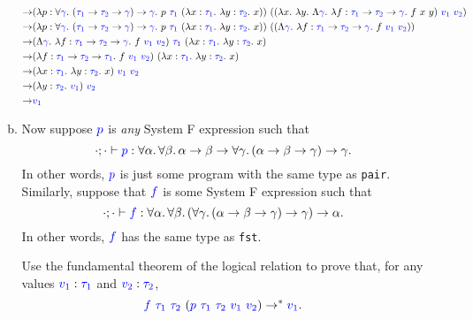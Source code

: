 \documentclass{article}
\theoremstyle{definition}
\newcommand{\meta}[1]{{\color{blue}#1}}
\begin{document}
\begin{enumerate}[start=1,label={{\bf Problem \arabic*}.},ref=\arabic*,left=0pt..0pt,widest*=10,align=left,itemindent=*]
\begin{enumerate}[(a),left=1em]
\begin{align*}
      \to & (\lambda p : \forall \meta{\gamma}.\ (\meta{\tau_1}\to\meta{\tau_2}\to\meta{\gamma}) \to \meta{\gamma}.\ p\ \meta{\tau_1}\ (\lambda x : \meta{\tau_1}.\ \lambda y : \meta{\tau_2}.\ x))\ ((\lambda x.\ \lambda y.\ \Lambda \meta{\gamma}.\ \lambda f : \meta{\tau_1} \to \meta{\tau_2} \to \meta{\gamma}.\ f\ x\ y)\ \meta{v_1}\ \meta{v_2}) \\
      \to & (\lambda p : \forall \meta{\gamma}.\ (\meta{\tau_1}\to\meta{\tau_2}\to\meta{\gamma}) \to \meta{\gamma}.\ p\ \meta{\tau_1}\ (\lambda x : \meta{\tau_1}.\ \lambda y : \meta{\tau_2}.\ x))\ ((\Lambda \meta{\gamma}.\ \lambda f : \meta{\tau_1} \to \meta{\tau_2} \to \meta{\gamma}.\ f\ \meta{v_1}\ \meta{v_2})) \\
      \to & (\Lambda \meta{\gamma}.\ \lambda f : \meta{\tau_1} \to \meta{\tau_2} \to \meta{\gamma}.\ f\ \meta{v_1}\ \meta{v_2})\ \meta{\tau_1}\ (\lambda x : \meta{\tau_1}.\ \lambda y : \meta{\tau_2}.\ x) \\
      \to & (\lambda f : \meta{\tau_1} \to \meta{\tau_2} \to \meta{\tau_1}.\ f\ \meta{v_1}\ \meta{v_2})\ (\lambda x : \meta{\tau_1}.\ \lambda y : \meta{\tau_2}.\ x) \\
      \to & (\lambda x : \meta{\tau_1}.\ \lambda y : \meta{\tau_2}.\ x)\ \meta{v_1}\ \meta{v_2} \\
      \to & (\lambda y : \meta{\tau_2}.\ \meta{v_1})\ \meta{v_2} \\
      \to & \meta{v_1}
    \end{align*}

  \item Now suppose $\meta{p}$ is \emph{any} System F expression such that
    \[
      \cdot;\cdot\vdash \meta{p}:\forall\alpha.\,\forall\beta.\, \alpha\to\beta\to \forall\gamma.\, (\alpha\to\beta\to\gamma)\to\gamma.
    \]
    In other words, $\meta{p}$ is just some program with the same type as
    \texttt{pair}.  Similarly, suppose that $\meta{f}$ is some System F
    expression such that
    \[
      \cdot;\cdot\vdash \meta{f}:\forall\alpha.\,\forall\beta.\, (\forall\gamma.\, (\alpha\to\beta\to\gamma)\to\gamma) \to \alpha.
    \]
    In other words, $\meta{f}$ has the same type as \texttt{fst}.

    Use the fundamental theorem of the logical relation to prove that, for any values
    $\meta{v_1}:\meta{\tau_1}$ and $\meta{v_2}:\meta{\tau_2}$,
    \[
      \meta{f}\ \meta{\tau_1}\ \meta{\tau_2}\ (\meta{p}\ \meta{\tau_1}\ \meta{\tau_2}\ \meta{v_1}\ \meta{v_2}) \to^* \meta{v_1}.
    \]
  \end{enumerate}
\end{enumerate}
\end{document}

